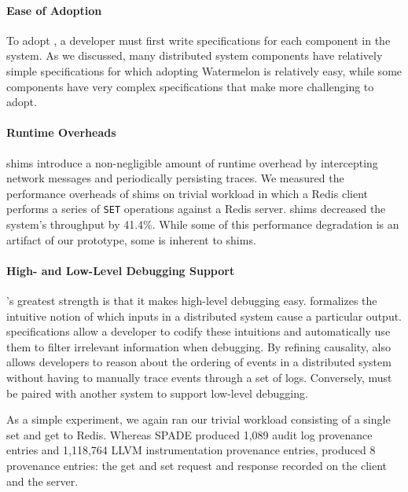 \paragraph{Ease of Adoption}
To adopt \fluent{}, a developer must first write \watprovenance{}
specifications for each component in the system. As we discussed, many
distributed system components have relatively simple \watprovenance{}
specifications for which adopting Watermelon is relatively easy, while some
components have very complex \watprovenance{} specifications that make
\fluent{} more challenging to adopt.

\paragraph{Runtime Overheads}
\fluent{} shims introduce a non-negligible amount of runtime overhead by
intercepting network messages and periodically persisting traces. We measured
the performance overheads of \fluent{} shims on trivial workload in which a
Redis client performs a series of \texttt{SET} operations against a Redis
server. \fluent{} shims decreased the system's throughput by 41.4\%. While some
of this performance degradation is an artifact of our prototype, some is
inherent to shims.

\paragraph{High- and Low-Level Debugging Support}
\fluent{}'s greatest strength is that it makes high-level debugging easy.
\Watprovenance{} formalizes the intuitive notion of which inputs in a
distributed system cause a particular output. \Watprovenance{} specifications
allow a developer to codify these intuitions and automatically use them to
filter irrelevant information when debugging. By refining causality,
\watprovenance{} also allows developers to reason about the ordering of events
in a distributed system without having to manually trace events through a set
of logs. Conversely, \fluent{} must be paired with another system to
support low-level debugging.

As a simple experiment, we again ran our trivial workload consisting of a
single set and get to Redis. Whereas SPADE produced 1,089 audit log provenance
entries and 1,118,764 LLVM instrumentation provenance entries, \fluent{}
produced 8 provenance entries: the get and set request and response recorded on
the client and the server.
